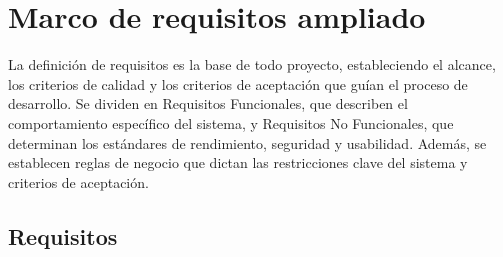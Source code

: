 \chapter{Marco de requisitos ampliado}

La definición de requisitos es la base de todo proyecto, estableciendo el alcance, los criterios de calidad y los criterios de aceptación que guían el proceso de desarrollo. Se dividen en Requisitos Funcionales, que describen el comportamiento específico del sistema, y Requisitos No Funcionales, que determinan los estándares de rendimiento, seguridad y usabilidad. Además, se establecen reglas de negocio que dictan las restricciones clave del sistema y criterios de aceptación.

\section{Requisitos}
\tablaajustada
